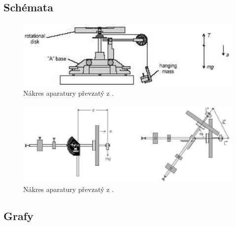 \documentclass[english]{article}
\begin{document}
\clearpage
\subsection{Schémata}

	\begin{figure}[h!]
		\begin{center}
		    	\includegraphics[width=\linewidth]{../prilohy/aparatura_1.png}
				\caption{Nákres aparatury převzatý z \cite{bib:zadani}.}
				\label{fig:s_aparatura_moment}
					    	
				
		\end{center}
	\end{figure}
	\begin{figure}[h!]
			\begin{center}
			    	\includegraphics[width=\linewidth]{../prilohy/aparatura_2.png}
					\caption{Nákres aparatury převzatý z \cite{bib:zadani}.}
					\label{fig:s_aparatura_gyro}
						    	
					
			\end{center}
		\end{figure}	
	

\clearpage
\subsection{Grafy}
\end{document}
